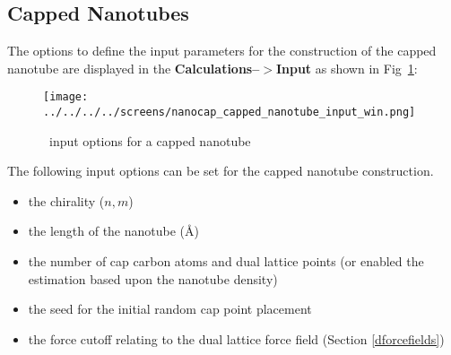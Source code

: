 %
%

\subsection{Capped Nanotubes}\label{cappednanotubes}

%
%
%
%
%

The options to define the input parameters for the construction of the capped nanotube are displayed in the \textbf{Calculations--$>$Input} as shown in Fig~\ref{capped_nanotube_input_options}:

 \begin{figure}[h!]
\centering
\texttt{[image: ../../../../screens/nanocap\_capped\_nanotube\_input\_win.png]}
\caption{\nanocap~input options for a capped nanotube}
\label{capped_nanotube_input_options}
\end{figure}

The following input options can be set for the capped nanotube construction.
\begin{itemize}
 \item the chirality ($n,m$)
 \item the length of the nanotube (\AA)
 \item the number of cap carbon atoms and dual lattice points (or enabled the estimation based upon the nanotube density)
 \item the seed for the initial random cap point placement
 \item the force cutoff relating to the dual lattice force field (Section \ref{dforcefields})
 \end{itemize}
 
 
 
